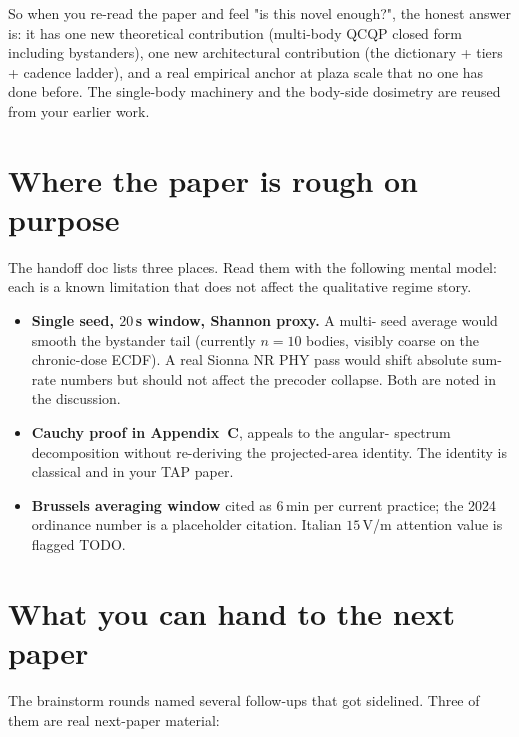 \documentclass[11pt]{article}
\begin{document}
So when you re-read the paper and feel "is this novel enough?", the
honest answer is: it has one new theoretical contribution (multi-body
QCQP closed form including bystanders), one new architectural
contribution (the dictionary + tiers + cadence ladder), and a real
empirical anchor at plaza scale that no one has done before. The
single-body machinery and the body-side dosimetry are reused from
your earlier work.

\section{Where the paper is rough on purpose}

The handoff doc lists three places. Read them with the following
mental model: each is a known limitation that does not affect the
qualitative regime story.

\begin{itemize}[leftmargin=1.4em,itemsep=2pt]
  \item \textbf{Single seed, $20\,$s window, Shannon proxy.} A multi-
  seed average would smooth the bystander tail (currently $n=10$
  bodies, visibly coarse on the chronic-dose ECDF). A real Sionna NR
  PHY pass would shift absolute sum-rate numbers but should not affect
  the precoder collapse. Both are noted in the discussion.
  \item \textbf{Cauchy proof in Appendix~C}, appeals to the angular-
  spectrum decomposition without re-deriving the projected-area
  identity. The identity is classical and in your TAP paper.
  \item \textbf{Brussels averaging window} cited as $6\,$min per
  current practice; the 2024 ordinance number is a placeholder
  citation. Italian $15\,$V/m attention value is flagged TODO.
\end{itemize}

\section{What you can hand to the next paper}

The brainstorm rounds named several follow-ups that got sidelined.
Three of them are real next-paper material:
\end{document}
